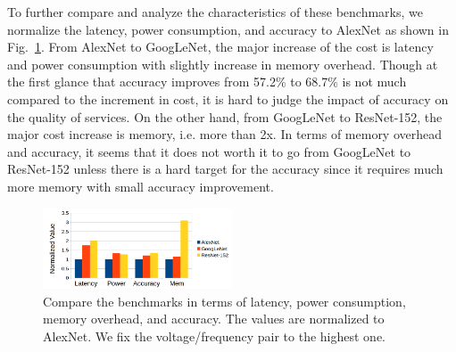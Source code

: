 To further compare and analyze the characteristics of these benchmarks, we normalize the latency, power consumption, and accuracy to AlexNet as shown in Fig.~\ref{fig:3}. From AlexNet to GoogLeNet, the major increase of the cost is latency and power consumption with slightly increase in memory overhead. Though at the first glance that accuracy improves from 57.2\% to 68.7\% is not much compared to the increment in cost, it is hard to judge the impact of accuracy on the quality of services. On the other hand, from GoogLeNet to ResNet-152, the major cost increase is memory, i.e. more than 2x. In terms of memory overhead and accuracy, it seems that it does not worth it to go from GoogLeNet to ResNet-152 unless there is a hard target for the accuracy since it requires much more memory with small accuracy improvement.

\begin{figure}[h]
    \centering
    \includegraphics[width=0.5\textwidth]{benchmark_compare.png}
    \caption{Compare the benchmarks in terms of latency, power consumption, memory overhead, and accuracy. The values are normalized to AlexNet. We fix the voltage/frequency pair to the highest one.}\label{fig:3}
\end{figure}